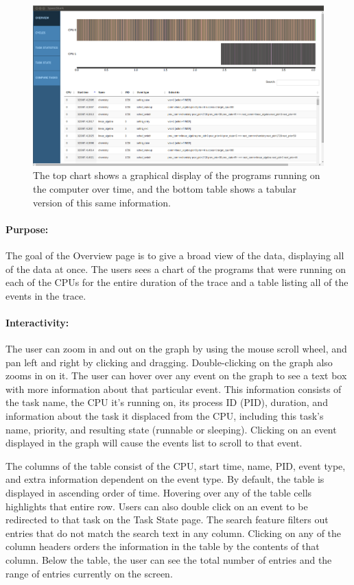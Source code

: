 \documentclass{hmcclinic}
\begin{document}
  \begin{figure}[H]
  \centering
      \includegraphics[width=5in]{overview-page.png}
  \caption{The top chart shows a graphical display of the programs running on the computer over time, and the bottom table shows a tabular version of this same information.}
  \end{figure}

\paragraph{Purpose:} 
The goal of the Overview page is to give a broad view of the data, displaying
all of the data at once.  The users sees a chart of the programs that were
running on each of the CPUs for the entire duration of the trace and a table
listing all of the events in the trace.

\paragraph{Interactivity:} The user can zoom in and out on the graph by using
the mouse scroll wheel, and pan left and right by clicking and dragging.
Double-clicking on the graph also zooms in on it. The user can hover over any
event on the graph to see a text box with more information about that particular
event.  This information consists of the task name, the CPU it's running on, its
process ID (PID), duration, and information about the task it displaced from the
CPU, including this task's name, priority, and resulting state (runnable or
sleeping). Clicking on an event displayed in the graph will cause the
events list to scroll to that event.

The columns of the table consist of the CPU, start time, name, PID, event type,
and extra information dependent on the event type. By default, the table is
displayed in ascending order of time.  Hovering over any of the table cells
highlights that entire row. Users can also double click on an event to be
redirected to that task on the Task State page.  The search feature filters out
entries that do not match the search text in any column.  Clicking on any of the
column headers orders the information in the table by the contents of that
column.  Below the table, the user can see the total number of entries and the
range of entries currently on the screen.
\end{document}
